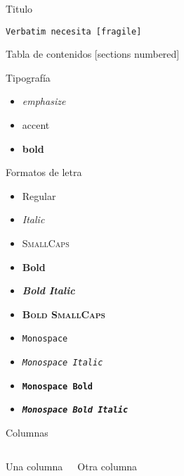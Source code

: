 
\begin{frame}[fragile]{Titulo}
    \begin{verbatim}Verbatim necesita [fragile]\end{verbatim}
\end{frame}

\begin{frame}{Tabla de contenidos}
    [sections numbered]
    \tableofcontents[hideallsubsections]
\end{frame}

\begin{frame}{Tipografía}
    \begin{itemize}
        \item \emph{emphasize}
        \item \alert{accent}
        \item \textbf{bold}
    \end{itemize}
\end{frame}

\begin{frame}{Formatos de letra}
    \begin{itemize}
        \item Regular
        \item \textit{Italic}
        \item \textsc{SmallCaps}
        \item \textbf{Bold}
        \item \textbf{\textit{Bold Italic}}
        \item \textbf{\textsc{Bold SmallCaps}}
        \item \texttt{Monospace}
        \item \texttt{\textit{Monospace Italic}}
        \item \texttt{\textbf{Monospace Bold}}
        \item \texttt{\textbf{\textit{Monospace Bold Italic}}}
    \end{itemize}
\end{frame}

\begin{frame}{Columnas}
    \begin{columns}[T,onlytextwidth]
        Una columna

        Otra columna
    \end{columns}
\end{frame}


